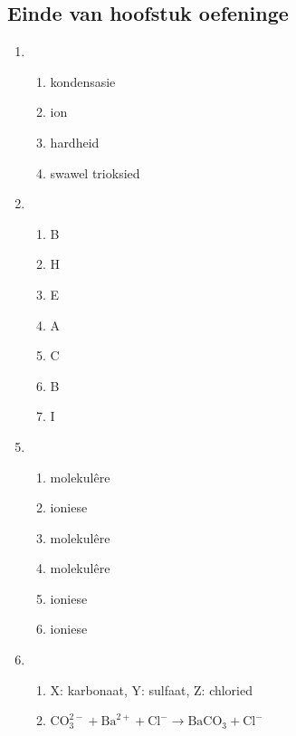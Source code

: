 \subsection{Einde van hoofstuk oefeninge}
\begin{multicols}{3}
 \begin{enumerate}[noitemsep, label=\textbf{(\arabic*)} ]
  \item 
\begin{enumerate}[noitemsep, label=\textbf{(\alph*)} ]
\item kondensasie
\item ion
\item hardheid
\item swawel trioksied
\end{enumerate}
\item 
\begin{enumerate}[noitemsep, label=\textbf{(\alph*)} ]
\item B
\item H
\item E
\item A
\item C
\item B
\item I
\end{enumerate}
\end{enumerate}
\begin{enumerate}[noitemsep, label=\textbf{(\arabic*)} ]
\setcounter{enumi}{4}
 \item 
\begin{enumerate}[noitemsep, label=\textbf{(\alph*)} ]
\item molekul\^{e}re
\item ioniese
\item molekul\^{e}re
\item molekul\^{e}re
\item ioniese
\item ioniese
\end{enumerate}
\item 
\begin{enumerate}[noitemsep, label=\textbf{(\alph*)} ]
\item X: karbonaat, Y: sulfaat, Z: chloried
\item $\text{CO}_{3}^{2-} + \text{Ba}^{2+} + \text{Cl}^{-} \to \text{BaCO}_{3} + \text{Cl}^{−}$
\end{enumerate}
\end{enumerate}

\end{multicols}

